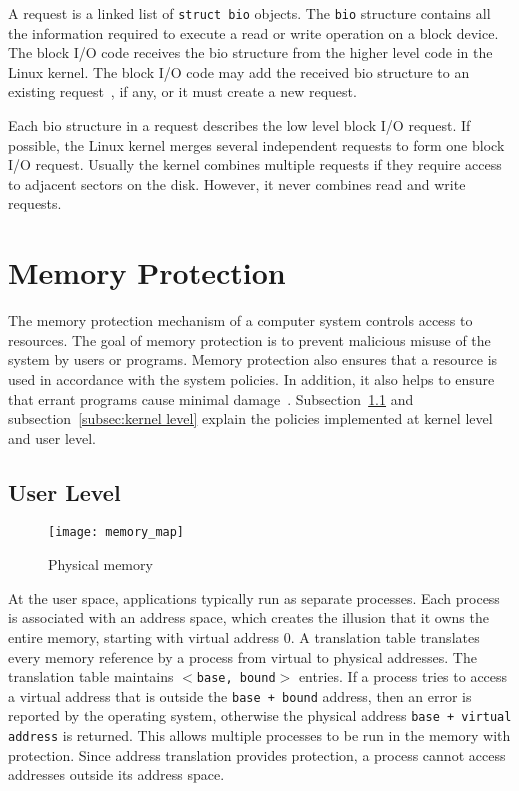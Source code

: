 A request is a linked list of \texttt{struct bio} objects. The \texttt{bio} 
structure contains all the information required to execute a read or write
operation on a block device. The block I/O code receives the bio
structure from the higher level code in the Linux kernel. The
block I/O code may add the received bio structure to an existing
request~\cite{Corbet:2005:LDD:1209083}, if any, or it must create
a new request.

Each bio structure in a request describes the low level block I/O
request. If possible, the Linux kernel merges several independent
requests to form one block I/O request. Usually the kernel combines
multiple requests if they require access to adjacent sectors on
the disk. However, it never combines read and write requests.

\section{Memory Protection}

The memory protection mechanism of a computer system controls
access to resources. The goal of memory protection is to prevent
malicious misuse of the system by users or programs. Memory
protection also ensures that a resource is used in accordance
with the system policies. In addition, it also helps to
ensure that errant programs cause minimal damage~\cite{Galvin,
Graham:1971:PPP:1478873.1478928}. Subsection~\ref{subsec:user level}
and subsection~\ref{subsec:kernel level} explain the policies implemented
at kernel level and user level.

\subsection{User Level}
\label{subsec:user level}

\begin{figure}[!ht]
\centering
\texttt{[image: memory\_map]}
\caption{Physical memory}
\label{fig:memmap}
\end{figure}

At the user space, applications typically run as separate processes. Each
process is associated with an address space, which creates the illusion that it owns the
entire memory, starting with virtual address 0. A translation
table translates every memory reference by a process from virtual
to physical addresses. The translation table maintains \texttt{$<$base,
bound$>$} entries. If a process tries to access a virtual address that
is outside the \texttt{base + bound} address, then an error is reported
by the operating system, otherwise the physical address \texttt{base +
virtual address} is returned. This allows multiple processes to be run in
the memory with protection. Since address translation provides protection,
a process cannot access addresses outside its address space.

